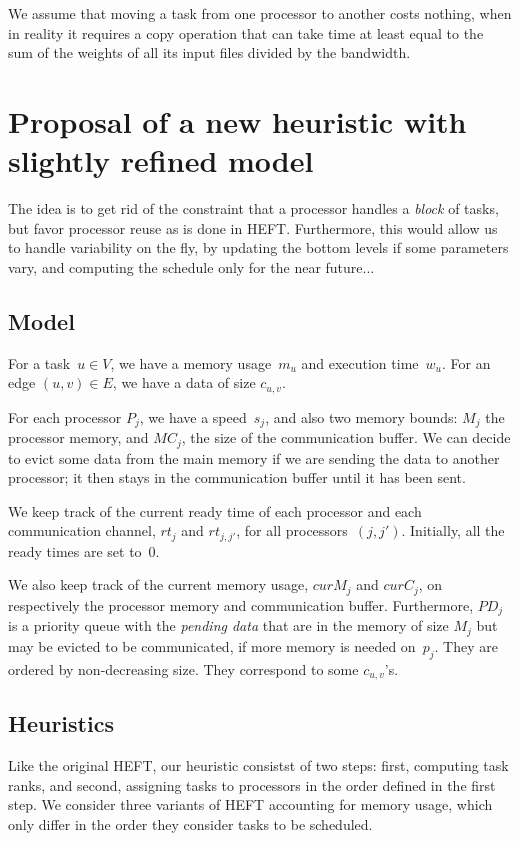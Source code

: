 \documentclass[sigconf,review,anonymous]{acmart}
\newcommand{\MM}{M}
\newcommand{\MC}{MC}
\newcommand{\rt}{rt}
\newcommand{\curM}{curM}
\newcommand{\curC}{curC}
\newcommand{\PD}{PD}
\begin{document}
    We assume that moving a task from one processor to another costs nothing, when in reality it requires a copy
    operation that can take time at least equal to the sum of the weights of all its input files divided by the bandwidth.


\section{Proposal of a new heuristic with slightly refined model}

The idea is to get rid of the constraint that a processor handles a {\em block} of tasks,
but favor processor reuse as is done in HEFT. 
Furthermore, this would allow us to handle variability on the fly, by updating
the bottom levels if some parameters vary, and computing the schedule
only for the near future...

\subsection{Model}

For a task~$u\in V$, we have a memory usage~$m_u$ and execution time~$w_u$.
For an  edge $(u,v)\in E$, we have a data of size $c_{u,v}$. 

For each processor $P_j$, we have a speed~$s_j$, and also two memory bounds: 
$\MM_j$ the processor memory, and $\MC_j$, the size of the communication buffer.
We can decide to evict some data from the main memory if we are sending the data
to another processor; it then stays in the communication buffer until it has been sent.

We keep track of the current ready time of each processor and each communication
channel, $\rt_j$ and $\rt_{j,j'}$, for all processors~$(j,j')$. Initially, all the ready times
are set to~$0$. 

We also keep track of the current memory usage, $\curM_j$ and $\curC_j$,
on respectively the processor memory and communication buffer. 
Furthermore, $\PD_j$ is a priority queue with the {\em pending data} 
that are in the memory of size $\MM_j$ but may be evicted to be communicated, if 
more memory is needed on~$p_j$. They are ordered by non-decreasing size. 
They correspond to some $c_{u,v}$'s. 



\subsection{Heuristics}
    Like the original HEFT, our heuristic consistst of two steps: first, computing task ranks,
    and second, assigning tasks to processors in the order defined in the first step.
    We consider three variants of HEFT accounting for memory usage, which only
    differ in the order they consider tasks to be scheduled.
\end{document}
